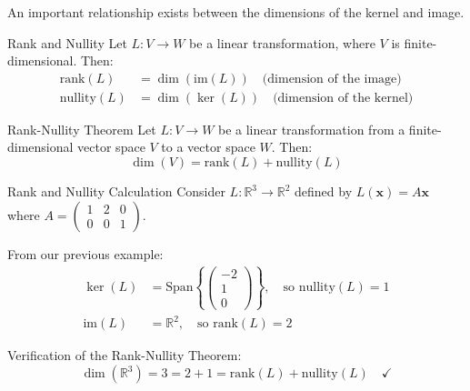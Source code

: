 \documentclass[12pt,a4paper]{article}
\newcommand{\R}{\mathbb{R}}
\newcommand{\vv}[1]{\mathbf{#1}}
\newcommand{\Span}{\text{Span}}
\newcommand{\rank}{\text{rank}}
\newcommand{\nullity}{\text{nullity}}
\newcommand{\im}{\text{im}}
\begin{document}
	An important relationship exists between the dimensions of the kernel and image.
	
	\begin{definition}{Rank and Nullity}
		Let $L: V \to W$ be a linear transformation, where $V$ is finite-dimensional. Then:
		\begin{align*}
			\text{rank}(L) &= \dim(\im(L)) \quad \text{(dimension of the image)} \\
			\text{nullity}(L) &= \dim(\ker(L)) \quad \text{(dimension of the kernel)}
		\end{align*}
	\end{definition}
	
	\begin{theorem}{Rank-Nullity Theorem}
		Let $L: V \to W$ be a linear transformation from a finite-dimensional vector space $V$ to a vector space $W$. Then:
		\[
		\dim(V) = \rank(L) + \nullity(L)
		\]
	\end{theorem}
	
	\begin{example}{Rank and Nullity Calculation}
		Consider $L: \R^3 \to \R^2$ defined by $L(\vv{x}) = A\vv{x}$ where $A = \begin{pmatrix} 1 & 2 & 0 \\ 0 & 0 & 1 \end{pmatrix}$.
		
		From our previous example:
		\begin{align*}
			\ker(L) &= \Span\left\{\begin{pmatrix} -2 \\ 1 \\ 0 \end{pmatrix}\right\}, \quad \text{so } \nullity(L) = 1 \\
			\im(L) &= \R^2, \quad \text{so } \rank(L) = 2
		\end{align*}
		
		Verification of the Rank-Nullity Theorem:
		\[
		\dim(\R^3) = 3 = 2 + 1 = \rank(L) + \nullity(L) \quad \checkmark
		\]
	\end{example}
	
\end{document}
